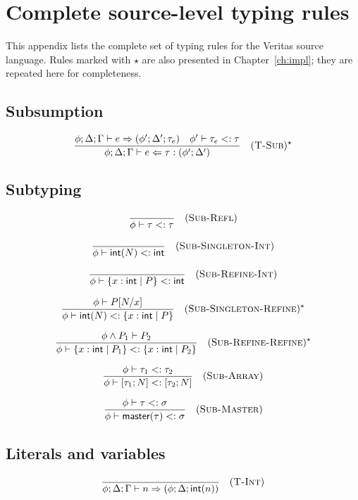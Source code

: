 \appendix
\chapter{Complete source-level typing rules}\label{app:source-rules}

This appendix lists the complete set of typing rules for the Veritas source language. Rules marked with $\star$ are also presented in Chapter~\ref{ch:impl}; they are repeated here for completeness.

\section*{Subsumption}

$$\frac{\phi; \Delta; \Gamma \vdash e \Rightarrow (\phi'; \Delta'; \tau_e) \quad \phi' \vdash \tau_e <: \tau}{\phi; \Delta; \Gamma \vdash e \Leftarrow \tau : (\phi'; \Delta')} \quad (\textsc{T-Sub})^\star$$

\section*{Subtyping}

$$\frac{}{\phi \vdash \tau <: \tau} \quad (\textsc{Sub-Refl})$$

$$\frac{}{\phi \vdash \textsf{int}(N) <: \textsf{int}} \quad (\textsc{Sub-Singleton-Int})$$

$$\frac{}{\phi \vdash \{x: \textsf{int} \mid P\} <: \textsf{int}} \quad (\textsc{Sub-Refine-Int})$$

$$\frac{\phi \vdash P[N/x]}{\phi \vdash \textsf{int}(N) <: \{x: \textsf{int} \mid P\}} \quad (\textsc{Sub-Singleton-Refine})^\star$$

$$\frac{\phi \wedge P_1 \vdash P_2}{\phi \vdash \{x: \textsf{int} \mid P_1\} <: \{x: \textsf{int} \mid P_2\}} \quad (\textsc{Sub-Refine-Refine})^\star$$

$$\frac{\phi \vdash \tau_1 <: \tau_2}{\phi \vdash [\tau_1; N] <: [\tau_2; N]} \quad (\textsc{Sub-Array})$$

$$\frac{\phi \vdash \tau <: \sigma}{\phi \vdash \textsf{master}(\tau) <: \sigma} \quad (\textsc{Sub-Master})$$

\section*{Literals and variables}

$$\frac{}{\phi; \Delta; \Gamma \vdash n \Rightarrow (\phi; \Delta; \textsf{int}(n))} \quad (\textsc{T-Int})$$

